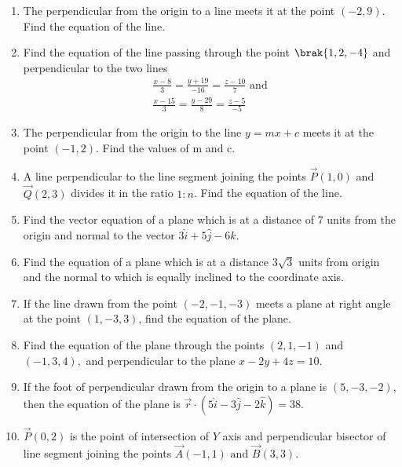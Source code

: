 \begin{enumerate}[label=\thesubsection.\arabic*, ref=\thesubsection.\theenumi]

\item 
	The perpendicular from the origin to a line meets it at the point $(-2, 9)$. Find the equation of the line.
\label{chapters/11/10/2/15}
	\\
	\solution

	\item Find the equation of the line passing through the point $\brak{1, 2, -4}$ and perpendicular to the two lines
\begin{align}
	\frac{x-8}{3}=\frac{y+19}{-16}=\frac{z-10}{7} \text{ and }\\ \frac{x-15}{3}=\frac{y-29}{8}=\frac{z-5}{-5} 
\end{align}
    \solution
		
 \item The perpendicular from the origin to the line $y=mx+c$ meets it at the point $(-1, 2)$. Find the values of m and c.
 \label{11.10.3.15}
	 \\
 \solution
 
\item 
A line perpendicular to the line segment joining the points $\vec{P}(1, 0)$ and $\vec{Q}(2, 3)$ divides it in the ratio $1:n$. Find the equation of the line.
	\\
	\solution 
\label{chapters/11/10/2/11}

\item Find the vector equation of a plane which is at a distance of 7 units from the origin and normal to the vector $3\hat{i}+5\hat{j}-6\hat{k}$.
	\\
    \solution
		
\item Find the equation of a plane which is at a distance 3$\sqrt{3}$ units from origin and the normal to which is equally inclined to the coordinate axis.
\item If the line drawn from the point $(-2, -1, -3)$ meets a plane at right angle at the point $(1, -3, 3)$,  find the equation of the plane.
\item Find the equation of the plane through the points $(2, 1, -1)$ and $(-1, 3, 4), $ and 
perpendicular to the plane $x-2y+4z=10.$
\item If the foot of perpendicular drawn from the origin to a plane is $(5, -3, -2)$,  then the equation of the plane is $\overrightarrow{r} \cdot (5\hat{i}-3\hat{j}-2\hat{k})=38.$
\item  $\vec{P}(0, 2)$ is the point of intersection of $Y$ axis and perpendicular bisector of line segment joining the points $\vec{A}(-1, 1) \text{ and } \vec{B}(3, 3)$.

\end{enumerate}
